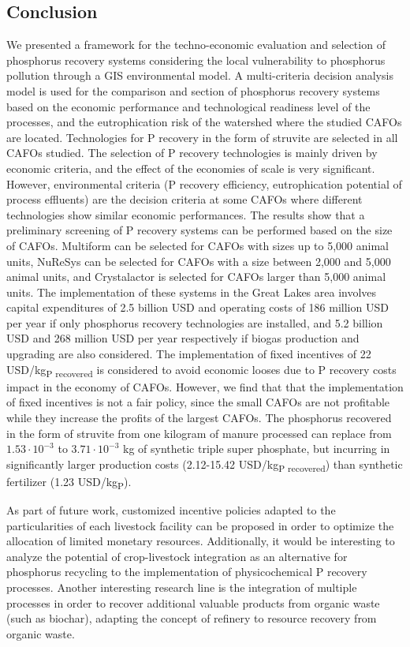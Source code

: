 \begin{refsection}[referencesCh4]
\section{Conclusion}
We presented a framework for the techno-economic evaluation and selection of phosphorus recovery systems considering the local vulnerability to phosphorus pollution through a GIS environmental model. A multi-criteria decision analysis model is used for the comparison and section of phosphorus recovery systems based on the economic performance and technological readiness level of the processes, and the eutrophication risk of the watershed where the studied CAFOs are located. Technologies for P recovery in the form of struvite are selected in all CAFOs studied. The selection of P recovery technologies is mainly driven by economic criteria, and the effect of the economies of scale is very significant. However, environmental criteria (P recovery efficiency, eutrophication potential of process effluents) are the decision criteria at some CAFOs where different technologies show similar economic performances. The results show that a preliminary screening of P recovery systems can be performed based on the size of CAFOs. Multiform can be selected for CAFOs with sizes up to 5,000 animal units,
NuReSys can be selected for CAFOs with a size between 2,000 and 5,000 animal units, and Crystalactor is selected for CAFOs larger than 5,000 animal units. The implementation of these systems in the Great Lakes area involves capital expenditures of 2.5 billion USD and operating costs of 186 million USD per year if only phosphorus recovery technologies are installed, and 5.2 billion USD and 268 million USD per year respectively if biogas production and upgrading are also considered. The implementation of fixed incentives of 22 USD/kg\textsubscript{P recovered} is considered to avoid economic looses due to P recovery costs impact in the economy of CAFOs. However, we find that that the implementation of
fixed incentives is not a fair policy, since the small CAFOs are not profitable while they increase the
profits of the largest CAFOs. The phosphorus recovered in the form of struvite from one kilogram of manure processed can replace from $1.53\cdot 10^{-3}$ to $3.71\cdot 10^{-3}$ kg of synthetic triple super phosphate, but incurring in significantly larger production costs (2.12-15.42 USD/kg\textsubscript{P recovered}) than synthetic fertilizer (1.23  USD/kg\textsubscript{P}). 

As part of future work, customized incentive policies adapted to the particularities of each livestock facility can be proposed in order to optimize the allocation of limited monetary resources. Additionally, it would be interesting to analyze the potential of crop-livestock integration as an alternative for phosphorus recycling to the implementation of physicochemical P recovery processes. Another interesting research line is the integration of multiple processes in order to recover additional valuable products from organic waste (such as biochar), adapting the concept of refinery to resource recovery from organic waste.


\end{refsection}
